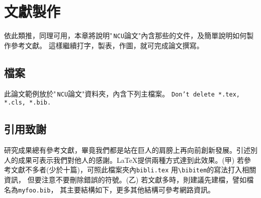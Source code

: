 
\chapter{文獻製作}
依此類推，同理可用，本章將說明"\,{\tt NCU}論文"內含那些的文件，及簡單說明如何製作參考文獻。
這樣繼續打字，製表，作圖，就可完成論文撰寫。
\section{檔案}
此論文範例放於"\,{\tt NCU}論文"資料夾，內含下列主檔案。
  
{\color{red} \Huge \tt Don't delete *.tex, *.cls, *.bib.} 
\section{引用致謝}
研究成果總有參考文獻，畢竟我們都是站在巨人的肩膀上再向前創新發展。引述別人的成果可表示我們對他人的感謝。\LaTeX{}提供兩種方式達到此效果。(甲)
若參考文獻不多者(少於十篇)，可照此檔案夾內{\tt bibli.tex} 用\verb+\bibitem+的寫法打入相關資訊， 但要注意不要刪除錯誤的符號。(乙) 若文獻多時，則建議先建檔，譬如檔名為{\tt myfoo.bib}， 其主要結構如下，更多其他結構可參考網路資訊。

